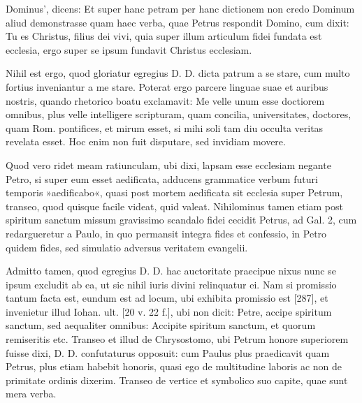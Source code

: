 Dominus', dicens: Et super hanc petram per hanc dictionem non credo Dominum aliud demonstrasse quam haec verba, quae Petrus respondit Domino, cum dixit: Tu es Christus, filius dei vivi, quia super illum articulum fidei fundata est ecclesia, ergo super se ipsum fundavit Christus ecclesiam.

Nihil est ergo, quod gloriatur egregius D. D. dicta patrum a se stare, cum multo fortius inveniantur a me stare. Poterat ergo parcere linguae suae et auribus nostris, quando rhetorico boatu exclamavit: Me velle unum esse doctiorem omnibus, plus velle intelligere scripturam, quam concilia, universitates, doctores, quam Rom. pontifices, et mirum esset, si mihi soli tam diu occulta veritas revelata esset. Hoc enim non fuit disputare, sed invidiam movere.

Quod vero ridet meam ratiunculam, ubi dixi, lapsam esse ecclesiam negante Petro, si super eum esset aedificata, adducens grammatice verbum futuri temporis »aedificabo«, quasi post mortem aedificata sit ecclesia super Petrum, transeo, quod quisque facile videat, quid valeat. Nihilominus tamen etiam post spiritum sanctum missum gravissimo scandalo fidei cecidit Petrus, ad Gal. 2, cum redargueretur a Paulo, in quo permansit integra fides et confessio, in Petro quidem fides, sed simulatio adversus veritatem evangelii.

Admitto tamen, quod egregius D. D. hac auctoritate praecipue nixus nunc se ipsum excludit ab ea, ut sic nihil iuris divini relinquatur ei. Nam si promissio tantum facta est, eundum est ad locum, ubi exhibita promissio est [287], et invenietur illud Iohan. ult. [20 v. 22 f.], ubi non dicit: Petre, accipe spiritum sanctum, sed aequaliter omnibus: Accipite spiritum sanctum, et quorum remiseritis etc. Transeo et illud de Chrysostomo, ubi Petrum honore superiorem fuisse dixi, D. D. confutaturus opposuit: cum Paulus plus praedicavit quam Petrus, plus etiam habebit honoris, quasi ego de multitudine laboris ac non de primitate ordinis dixerim. Transeo de vertice et symbolico suo capite, quae sunt mera verba.

